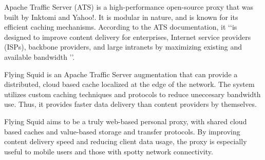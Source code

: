 Apache Traffic Server (ATS) is a high-performance open-source proxy that was built by Inktomi and Yahoo!. It is modular in nature, and is known for its efficient caching mechanisms. According to the ATS documentation, it \lq \lq is designed to improve content delivery for enterprises, Internet service providers (ISPs), backbone providers, and large intranets by maximizing existing and available bandwidth \rq \rq \cite{ATS}.

Flying Squid is an Apache Traffic Server augmentation that can provide a distributed, cloud based cache localized at the edge of the network. The system utilizes custom caching techniques and protocols to reduce uneccesary bandwidth use. Thus, it provides faster data delivery than content providers by themselves. 


Flying Squid aims to be a truly web-based personal proxy, with shared cloud based caches and value-based storage and transfer protocols. By improving content delivery speed and reducing client data usage, the proxy is especially useful to mobile users and those with spotty network connectivity.
